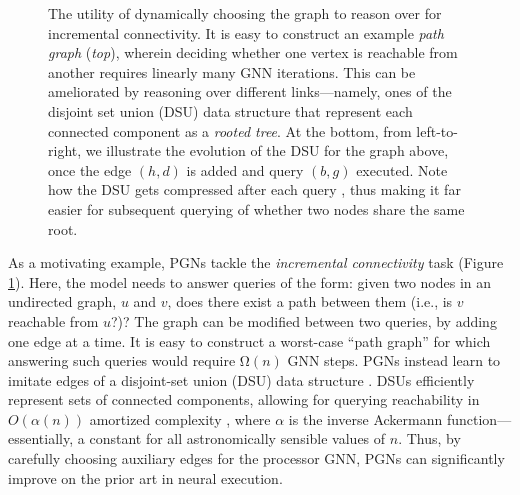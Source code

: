 \documentclass[twoside,11pt]{article}
\begin{document}
\begin{figure}

	\caption{The utility of dynamically choosing the graph to reason over for {incremental connectivity}. It is easy to construct an example \emph{path graph} (\textit{top}), wherein deciding whether one vertex is reachable from another requires linearly many GNN iterations. This can be ameliorated by reasoning over different links---namely, ones of the disjoint set union (DSU) data structure \citep{Galler1964} that represent each connected component as a \emph{rooted tree}. At the {bottom}, from {left-to-right}, we illustrate the evolution of the DSU for the graph above, once the edge $(h, d)$ is added and query $(b, g)$ executed. Note how the DSU gets {compressed} after each query \citep{Tarjan1975}, thus making it far easier for subsequent querying of whether two nodes share the same root.}
	\label{pgn_setup}
\end{figure}

As a motivating example, PGNs tackle the \emph{incremental connectivity} task (Figure \ref{pgn_setup}). Here, the model needs to answer queries of the form: given two nodes in an undirected graph, $u$ and $v$, does there exist a path between them (i.e., is $v$ reachable from $u$?)? The graph can be modified between two queries, by adding one edge at a time. It is easy to construct a worst-case ``path graph'' for which answering such queries would require $\mathrm{\Omega}(n)$ GNN steps. PGNs instead learn to imitate edges of a disjoint-set union (DSU) data structure \citep{Galler1964}. DSUs efficiently represent sets of connected components, allowing for querying reachability in $O(\alpha(n))$ amortized complexity \citep{Tarjan1975}, where $\alpha$ is the inverse Ackermann function---essentially, a {constant} for all astronomically sensible values of $n$. Thus, by carefully choosing auxiliary edges for the processor GNN, PGNs can significantly improve on the prior art in neural execution.
\end{document}
